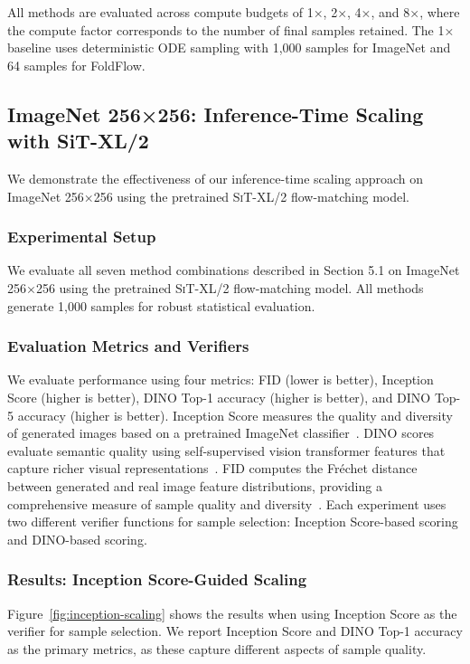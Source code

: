 \documentclass{article}
\begin{document}
All methods are evaluated across compute budgets of 1×, 2×, 4×, and 8×, where the compute factor corresponds to the number of final samples retained. The 1× baseline uses deterministic ODE sampling with 1,000 samples for ImageNet and 64 samples for FoldFlow.

\subsection{ImageNet 256×256: Inference-Time Scaling with SiT-XL/2}

We demonstrate the effectiveness of our inference-time scaling approach on ImageNet 256×256 using the pretrained \textsc{SiT-XL/2} flow-matching model.

\subsubsection{Experimental Setup}

We evaluate all seven method combinations described in Section 5.1 on ImageNet 256×256 using the pretrained \textsc{SiT-XL/2} flow-matching model. All methods generate 1,000 samples for robust statistical evaluation.

\subsubsection{Evaluation Metrics and Verifiers}

We evaluate performance using four metrics: FID (lower is better), Inception Score (higher is better), DINO Top-1 accuracy (higher is better), and DINO Top-5 accuracy (higher is better). Inception Score measures the quality and diversity of generated images based on a pretrained ImageNet classifier~\cite{salimans2016improved}. DINO scores evaluate semantic quality using self-supervised vision transformer features that capture richer visual representations~\cite{caron2021emerging}. FID computes the Fréchet distance between generated and real image feature distributions, providing a comprehensive measure of sample quality and diversity~\cite{heusel2017gans}. Each experiment uses two different verifier functions for sample selection: Inception Score-based scoring and DINO-based scoring.

\subsubsection{Results: Inception Score-Guided Scaling}

Figure~\ref{fig:inception-scaling} shows the results when using Inception Score as the verifier for sample selection. We report Inception Score and DINO Top-1 accuracy as the primary metrics, as these capture different aspects of sample quality.
\end{document}
